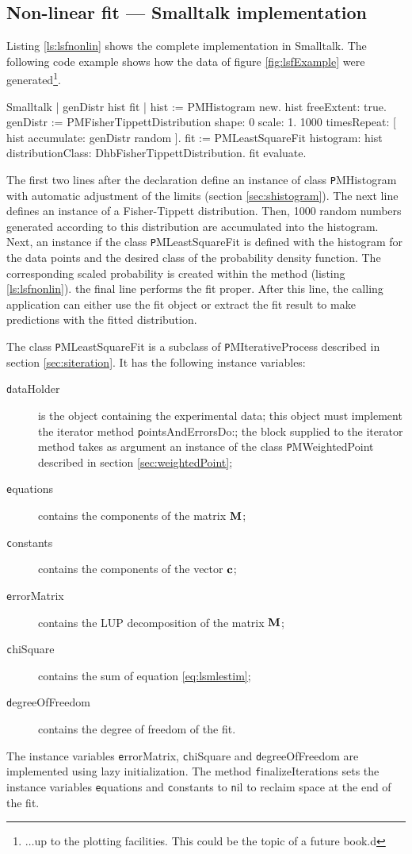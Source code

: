 \subsection{Non-linear fit --- Smalltalk implementation}
\label{sec:slsfnonlin}Listing \ref{ls:lsfnonlin} shows the
complete implementation in Smalltalk. The following code example
shows how the data of figure \ref{fig:lsfExample} were
generated\footnote{$\ldots$up to the plotting facilities. This
could be the topic of a future book.d}.
\begin{displaycode}{Smalltalk}
\label{exs:leastSquare}
 | genDistr hist fit |
 hist := PMHistogram new.
 hist freeExtent: true.
 genDistr := PMFisherTippettDistribution shape: 0 scale: 1.
 1000 timesRepeat: [ hist accumulate: genDistr random ].
 fit := PMLeastSquareFit histogram: hist
            distributionClass: DhbFisherTippettDistribution.
 fit evaluate.
\end{displaycode}
The first two lines after the declaration define an instance of
class {\texttt PMHistogram} with automatic adjustment of the limits
(\cf section \ref{sec:shistogram}).
The next line defines an
instance of a Fisher-Tippett distribution. Then, 1000 random
numbers generated according to this distribution are accumulated
into the histogram. Next, an instance if the class {\texttt
PMLeastSquareFit} is defined with the histogram for the data
points and the desired class of the probability density function.
The corresponding scaled probability is created within the method
(\cf listing \ref{ls:lsfnonlin}). the final line performs the fit
proper. After this line, the calling application can either use
the fit object or extract the fit result to make predictions with
the fitted distribution.

The class {\texttt PMLeastSquareFit} is a subclass of {\texttt
PMIterativeProcess} described in section \ref{sec:siteration}. It
has the following instance variables:
\begin{description}
  \item[\texttt dataHolder] is the object containing the experimental
  data; this object must implement the iterator method {\texttt
  pointsAndErrorsDo:}; the block supplied to the iterator method
  takes as argument an instance of the class {\texttt
  PMWeightedPoint} described in section \ref{sec:weightedPoint};
  \item[\texttt equations] contains the components of the matrix ${\textbf
  M}$;
  \item[\texttt constants] contains the components of the vector ${\textbf
  c}$;
  \item[\texttt errorMatrix] contains the LUP decomposition of the matrix ${\textbf
  M}$;
  \item[\texttt chiSquare] contains the sum of equation \ref{eq:lsmlestim};
  \item[\texttt degreeOfFreedom] contains the degree of freedom of the
  fit.
\end{description}
The instance variables {\texttt errorMatrix}, {\texttt chiSquare} and {\texttt
degreeOfFreedom} are implemented using lazy initialization. The
method {\texttt finalizeIterations} sets the instance variables {\texttt
equations} and {\texttt constants} to {\texttt nil} to reclaim space at
the end of the fit.

